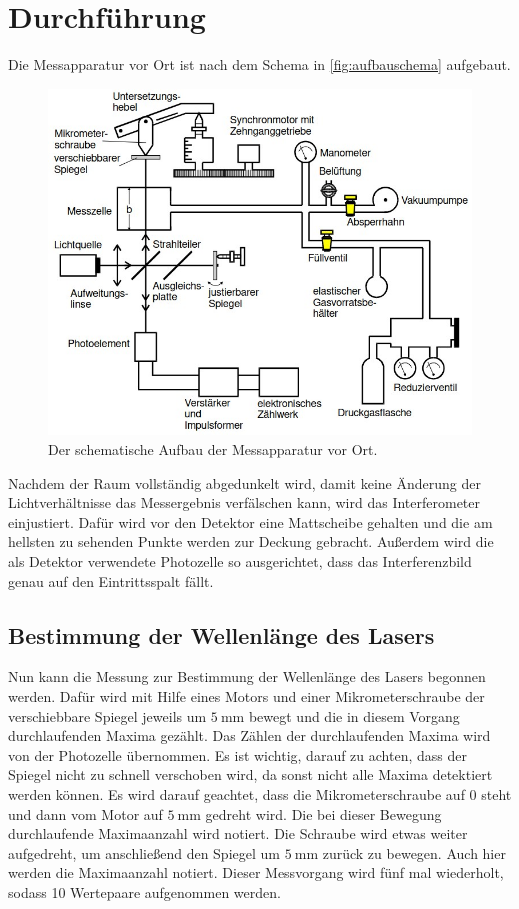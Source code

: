 \section{Durchführung}
\label{sec:Durchführung}
Die Messapparatur vor Ort ist nach dem Schema in \autoref{fig:aufbauschema} aufgebaut.
\begin{figure}
    \centering
    \includegraphics[width=\textwidth]{content/aufbauversuch.jpg}
    \caption{Der schematische Aufbau der Messapparatur vor Ort.}
    \label{fig:aufbauschema}
\end{figure}

\noindent
Nachdem der Raum vollständig abgedunkelt wird, damit keine Änderung der Lichtverhältnisse das Messergebnis verfälschen kann, wird das Interferometer einjustiert.
Dafür wird vor den Detektor eine Mattscheibe gehalten und die am hellsten zu sehenden Punkte werden zur Deckung gebracht. Außerdem wird die als Detektor verwendete
Photozelle so ausgerichtet, dass das Interferenzbild genau auf den Eintrittsspalt fällt.


\subsection{Bestimmung der Wellenlänge des Lasers}
Nun kann die Messung zur Bestimmung der Wellenlänge des Lasers begonnen werden. Dafür wird mit Hilfe eines Motors und einer Mikrometerschraube der verschiebbare 
Spiegel jeweils um $\SI{5}{\milli\meter}$ bewegt und die in diesem Vorgang durchlaufenden Maxima gezählt. Das Zählen der durchlaufenden Maxima wird von der 
Photozelle übernommen. Es ist wichtig, darauf zu achten, dass der Spiegel nicht zu schnell verschoben wird, da sonst nicht alle Maxima detektiert werden können.
Es wird darauf geachtet, dass die Mikrometerschraube auf 0 steht und dann vom Motor auf $\SI{5}{\milli\metre}$ gedreht wird. Die bei dieser Bewegung durchlaufende
Maximaanzahl wird notiert. Die Schraube wird etwas weiter aufgedreht, um anschließend den Spiegel um $\SI{5}{\milli\meter}$ zurück zu bewegen. Auch hier werden die Maximaanzahl notiert.
Dieser Messvorgang wird fünf mal wiederholt, sodass 10 Wertepaare aufgenommen werden.

